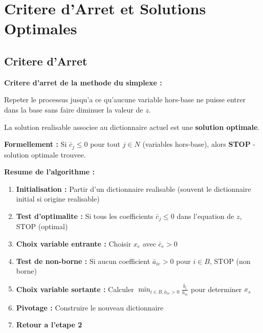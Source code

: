 \documentclass[12pt,a4paper]{article}
\begin{document}
\newpage
\section{Critere d'Arret et Solutions Optimales}

\subsection{Critere d'Arret}

\begin{definition}
\textbf{Critere d'arret de la methode du simplexe :}

Repeter le processus jusqu'a ce qu'aucune variable hors-base ne puisse entrer dans la base sans faire diminuer la valeur de $z$.

La solution realisable associee au dictionnaire actuel est une \textcolor{defvert}{\textbf{solution optimale}}.

\textbf{Formellement :} Si $\bar{c}_j \leq 0$ pour tout $j \in N$ (variables hors-base), alors \textcolor{importantrouge}{\textbf{STOP}} - solution optimale trouvee.
\end{definition}

\begin{astuce}
\textbf{Resume de l'algorithme :}

\begin{enumerate}
    \item \textbf{Initialisation :} Partir d'un dictionnaire realisable (souvent le dictionnaire initial si origine realisable)
    
    \item \textbf{Test d'optimalite :} Si tous les coefficients $\bar{c}_j \leq 0$ dans l'equation de $z$, \textcolor{defvert}{STOP} (optimal)
    
    \item \textbf{Choix variable entrante :} Choisir $x_e$ avec $\bar{c}_e > 0$
    
    \item \textbf{Test de non-borne :} Si aucun coefficient $\bar{a}_{ie} > 0$ pour $i \in B$, \textcolor{importantrouge}{STOP} (non borne)
    
    \item \textbf{Choix variable sortante :} Calculer $\min_{i \in B, \bar{a}_{ie} > 0} \frac{\bar{b}_i}{\bar{a}_{ie}}$ pour determiner $x_s$
    
    \item \textbf{Pivotage :} Construire le nouveau dictionnaire
    
    \item \textbf{Retour a l'etape 2}
\end{enumerate}
\end{astuce}
\end{document}
